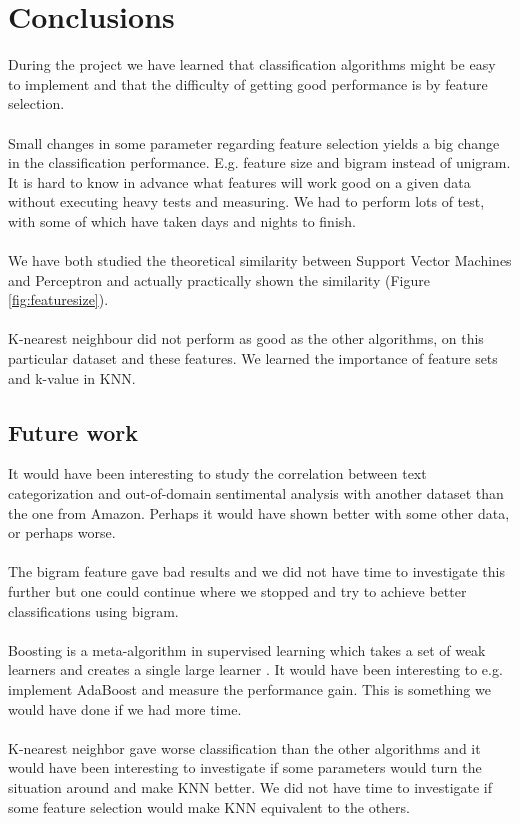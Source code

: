 \chapter{Conclusions}
During the project we have learned that classification algorithms might be easy to implement and that the difficulty of getting good performance is by feature selection. \\\\
Small changes in some parameter regarding feature selection yields a big change in the classification performance. E.g. feature size and bigram instead of unigram. It is hard to know in advance what features will work good on a given data without executing heavy tests and measuring. We had to perform lots of test, with some of which have taken days and nights to finish. 
\\\\
We have both studied the theoretical similarity between Support Vector Machines and Perceptron and actually practically shown the similarity (Figure \ref{fig:featuresize}).
\\\\
K-nearest neighbour did not perform as good as the other algorithms, on this particular dataset and these features. We learned the importance of feature sets and k-value in KNN.
\section{Future work}
It would have been interesting to study the correlation between text categorization and out-of-domain sentimental analysis with another dataset than the one from Amazon. Perhaps it would have shown better with some other data, or perhaps worse.  \\\\
The bigram feature gave bad results and we did not have time to investigate this further but one could continue where we stopped and try to achieve better classifications using bigram.  \\\\
Boosting is a meta-algorithm in supervised learning which takes a set of weak learners and creates a single large learner \citep{boosting}. It would have been interesting to e.g. implement AdaBoost and measure the performance gain. This is something we would have done if we had more time. \\\\
K-nearest neighbor gave worse classification than the other algorithms and it would have been interesting to investigate if some parameters would turn the situation around and make KNN better. We did not have time to investigate if some feature selection would make KNN equivalent to the others.